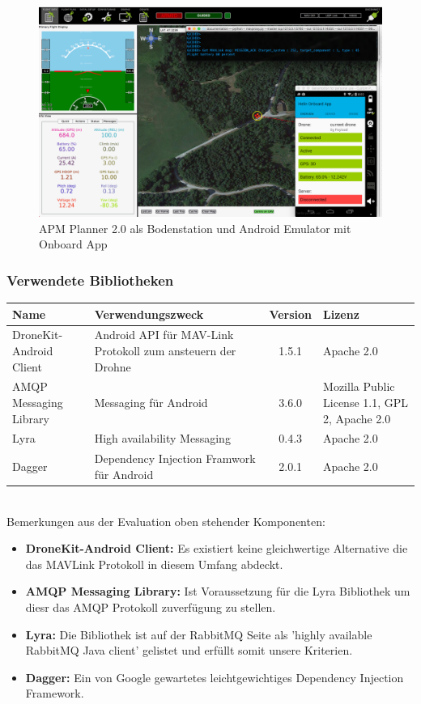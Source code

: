 \begin{figure}[H]
	\includegraphics[width=1.0\textwidth]{images/test-setup-onboard.png}
	\caption{APM Planner 2.0 als Bodenstation und Android Emulator mit Onboard App}
	\label{fig:test-setup-onboard}
\end{figure}

\subsubsection{Verwendete Bibliotheken}
\begin{tabularx}{\textwidth}{|X|X|c|X|}
	\hline
	\textbf{Name} & \textbf{Verwendungszweck} & \textbf{Version} & \textbf{Lizenz} \\
	\hline \hline
	DroneKit-Android Client & Android API für MAV-Link Protokoll zum ansteuern der Drohne & 1.5.1 & Apache 2.0\\
	\hline 
	AMQP Messaging Library & Messaging für Android & 3.6.0 &  Mozilla Public License 1.1, GPL 2,  Apache 2.0 \\
	\hline 
	Lyra  & High availability Messaging & 0.4.3 &  Apache 2.0 \\
	\hline 
	Dagger  & Dependency Injection Framwork für Android & 2.0.1 &  Apache 2.0 \\
	\hline 
\end{tabularx} \\

Bemerkungen aus der Evaluation oben stehender Komponenten:
\begin{itemize}
	\item{\textbf{DroneKit-Android Client:} Es existiert keine gleichwertige Alternative die das \Gls{MAVLink} Protokoll in diesem Umfang abdeckt.}
	\item{\textbf{AMQP Messaging Library:} Ist Voraussetzung für die Lyra Bibliothek um diesr das \Gls{AMQP} Protokoll zuverfügung zu stellen.}
	\item{\textbf{Lyra:} Die Bibliothek ist auf der RabbitMQ Seite als 'highly available RabbitMQ Java client' gelistet und erfüllt somit unsere Kriterien. \cite[]{lyra-page} }
	\item{\textbf{Dagger:} Ein von Google gewartetes leichtgewichtiges  Dependency Injection Framework.}
\end{itemize}


